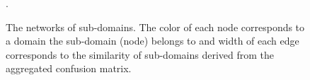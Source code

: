 \begin{figure}
{   \label{random_under_graph_sub_original}%
}
\caption{The networks of sub-domains. The color of each node corresponds to a domain the sub-domain (node) belongs to and width of each edge corresponds to the similarity of sub-domains derived from the aggregated confusion matrix.} \label{meta_network}.
\end{figure}


